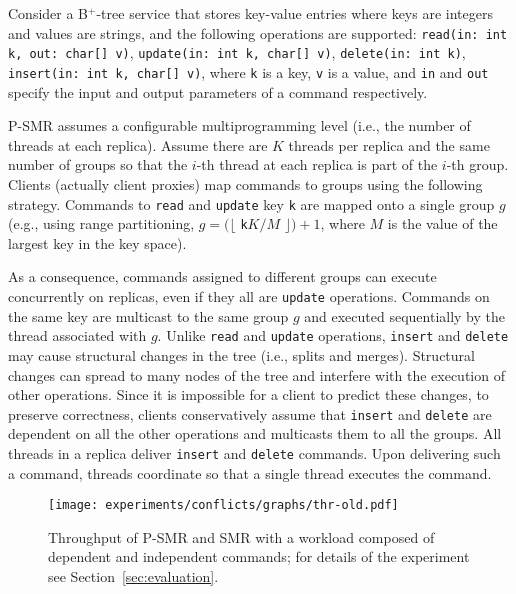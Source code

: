 \documentclass[conference]{IEEEtran}
\newcommand{\sizefactor}{0.9}
\begin{document}
Consider a B$^+$-tree service that stores key-value entries where keys are integers and values are strings, and the following operations are supported: \texttt{read(in: int k, out: char[] v)}, \texttt{update(in: int k, char[] v)}, \texttt{delete(in: int k)}, \texttt{insert(in: int k, char[] v)}, where \texttt{k} is a key, \texttt{v} is a value, and \texttt{in} and \texttt{out} specify the input and output parameters of a command respectively. 




P-SMR assumes a configurable multiprogramming level (i.e., the number of threads at each replica).
Assume there are $K$ threads per replica and the same number of groups so that the $i$-th thread at each replica is part of the $i$-th group.
Clients (actually client proxies) map commands to groups using the following strategy.
Commands to \texttt{read} and \texttt{update} key \texttt{k} are mapped onto a single group $g$ (e.g., using range partitioning, $g = (\lfloor$ \texttt{k}$K/M$ $\rfloor) + 1$, where $M$ is the value of the largest key in the key space).


As a consequence, commands assigned to different groups can execute concurrently on replicas, even if they all are \texttt{update} operations.
Commands on the same key are multicast to the same group $g$ and executed sequentially by the thread associated with $g$.
Unlike \texttt{read} and \texttt{update} operations, \texttt{insert} and \texttt{delete} may cause structural changes in the tree (i.e., splits and merges).
Structural changes can spread to many nodes of the tree and interfere with the execution of other operations. 
Since it is impossible for a client to predict these changes, to preserve correctness, clients conservatively assume that \texttt{insert} and \texttt{delete} are dependent on all the other operations and multicasts them to all the groups.
All threads in a replica deliver \texttt{insert} and \texttt{delete} commands. Upon delivering such a command, threads coordinate so that a single thread executes the command.







\begin{figure}[ht]
  \begin{center}
      \texttt{[image: experiments/conflicts/graphs/thr-old.pdf]} 
    \caption{Throughput of P-SMR and SMR with a workload composed of dependent and independent commands; for details of the experiment see Section~\ref{sec:evaluation}.}
        \label{fig:psmr-performance}
  \end{center}
\end{figure}
\end{document}
